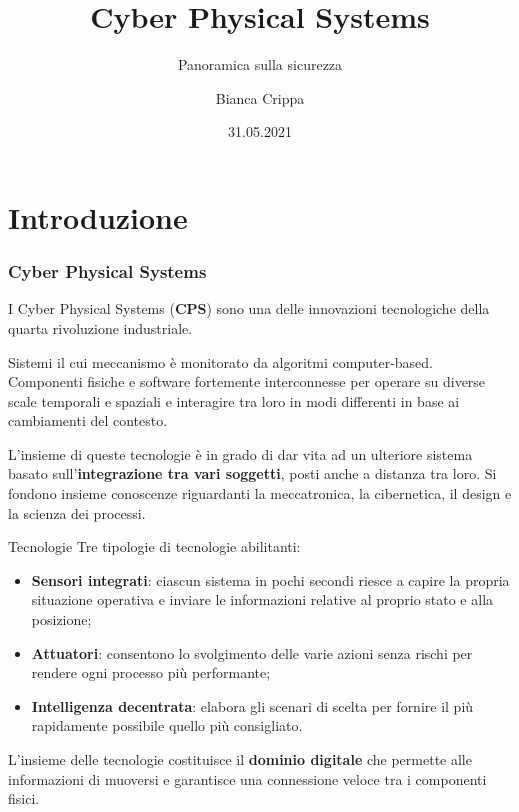 \documentclass{beamer}
\title{Cyber Physical Systems}
\subtitle{Panoramica sulla sicurezza}
\author{Bianca Crippa}
\institute{Università degli Studi di Bergamo
    \\ \url{https://github.com/Biancolinaa/CPS-presentation.git}
}
\date{31.05.2021}
\begin{document}
\frame{\titlepage}


\section{Introduzione}

\begin{frame}
    \frametitle{Cyber Physical Systems}
    I Cyber Physical Systems (\textbf{CPS}) sono una delle innovazioni tecnologiche della quarta rivoluzione industriale.
    
    Sistemi il cui meccanismo è monitorato da algoritmi computer-based. 
    Componenti fisiche e software fortemente interconnesse per operare su diverse scale temporali e spaziali e  
    interagire tra loro in modi differenti in base ai cambiamenti del contesto. 

    L'insieme di queste tecnologie è in grado di dar vita ad un ulteriore sistema basato sull'\textbf{integrazione tra vari soggetti}, posti anche a 
    distanza tra loro.    
    Si fondono insieme conoscenze riguardanti la meccatronica, la cibernetica, il design e la scienza dei processi.
    
\end{frame}

\begin{frame}{Tecnologie}
Tre tipologie di tecnologie abilitanti:
\begin{itemize}
    \item \textbf{Sensori integrati}: ciascun sistema in pochi secondi riesce a capire la propria situazione operativa e inviare le informazioni relative al 
    proprio stato e alla posizione;
    \item \textbf{Attuatori}: consentono lo svolgimento delle varie azioni senza rischi per rendere ogni processo più performante;
    \item \textbf{Intelligenza decentrata}: elabora gli scenari di scelta per fornire il più rapidamente possibile quello più consigliato.
\end{itemize}

L'insieme delle tecnologie costituisce il \textbf{dominio digitale} che permette alle informazioni di muoversi e garantisce una connessione veloce tra i 
componenti fisici.

\end{frame}
\end{document}
